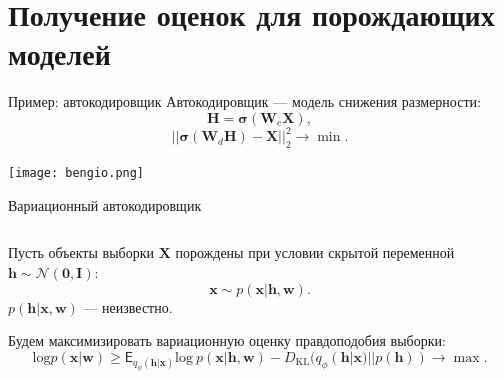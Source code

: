 \documentclass[10pt,pdf,utf8,russian,aspectratio=169]{beamer}
\begin{document}
\section{Получение оценок для порождающих моделей}
\begin{frame}{Пример: автокодировщик}
Автокодировщик --- модель снижения размерности:
$$
	\mathbf{H} = \boldsymbol{\sigma}(\mathbf{W}_e \mathbf{X}),
$$
$$
	||\boldsymbol{\sigma}(\mathbf{W}_d\mathbf{H}) - \mathbf{X}||_2^2 \to \min.
$$

\texttt{[image: bengio.png]}
\end{frame}



\begin{frame}{Вариационный автокодировщик}
\begin{columns}[T]
\begin{column}{.65\textwidth}
Пусть объекты выборки $\mathbf{X}$ порождены при условии скрытой переменной $\mathbf{h} \sim \mathcal{N}(\mathbf{0}, \mathbf{I})$:
$$
\mathbf{x} \sim p(\mathbf{x}|\mathbf{h}, \mathbf{w}).
$$
$p(\mathbf{h}|\mathbf{x}, \mathbf{w})$ --- неизвестно.

Будем максимизировать вариационную оценку правдоподобия выборки:
$$
\text{log}p(\mathbf{x}|\mathbf{w}) \geq \mathsf{E}_{q_\phi(\mathbf{h}|\mathbf{x})}\text{log}~p(\mathbf{x}|\mathbf{h}, \mathbf{w}) - D_\text{KL}(q_\phi(\mathbf{h}|\mathbf{x})||p(\mathbf{h})) \to \max.
$$


\end{column}
\end{columns}
\end{frame}
\end{document}
